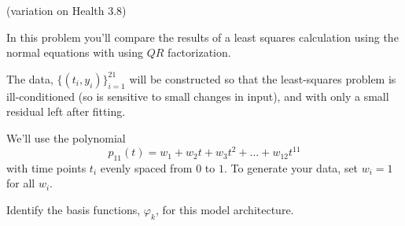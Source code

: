 \documentclass[12pt,letterpaper,noanswers]{exam}
\begin{document}
\begin{questions}









\question (variation on Health 3.8)

In this problem you'll compare the results of a least squares calculation using the normal equations with using $QR$ factorization.


The data, $\{(t_i,y_i)\}_{i=1}^21$ will be constructed so that the least-squares problem is ill-conditioned (so is sensitive to small changes in input), and with only a small residual left after fitting.

We'll use the polynomial \[p_{11}(t) = w_1+w_2t+w_3t^2 + ... + w_{12}t^{11} \] with time points $t_i$ evenly spaced from $0$ to $1$.  To generate your data, set $w_i = 1$ for all $w_i$.

\begin{parts}
\item Identify the basis functions, $\varphi_k$, for this model architecture.


\end{parts}
\end{questions}
\end{document}
